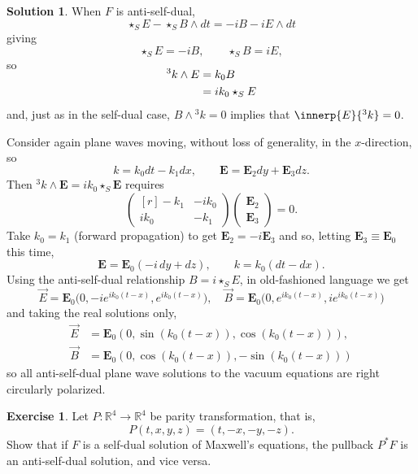 \documentclass[11pt, a4paper]{report}
\theoremstyle{definition}
\newtheorem{ex}{Exercise}[part]
\newtheorem{sol}{Solution}[part]
\begin{document}
\begin{sol}
When $F$ is anti-self-dual,
\[
    \star_S E - \star_S B \wedge dt = -iB - iE \wedge dt
\]
giving
\[
    \star_S E = -i B, \qquad
    \star_S B = iE,
\]
so
\begin{align*}
    \SwapAboveDisplaySkip
    ^3k \wedge E &= k_0 B \\
                 &= ik_0 \star_S E
\end{align*}
and, just as in the self-dual case, $B \wedge {}^3 k = 0$ implies that $\innerp{E}{^3k} = 0$.

Consider again plane waves moving, without loss of generality, in the $x$-direction, so
\[
    k = k_0 dt - k_1 dx, \qquad
    \mathbf{E} = \mathbf{E}_2 dy + \mathbf{E}_3 dz.
\]
Then $^3k \wedge \mathbf{E} = ik_0 \star_S \mathbf{E}$ requires
\[
    \begin{pmatrix*}[r]
        -k_1  & -ik_0 \\
        ik_0 & -k_1
    \end{pmatrix*}
    \begin{pmatrix}
        \mathbf{E}_2 \\ \mathbf{E}_3
    \end{pmatrix}
    = 0.
\]
Take $k_0 = k_1$ (forward propagation) to get $\mathbf{E}_2 = -i \mathbf{E}_3$ and so, letting $\mathbf{E}_3 \equiv \mathbf{E}_0$ this time,
\[
    \mathbf{E} = \mathbf{E}_0 (-i \, dy + dz), \qquad
    k = k_0 (dt - dx).
\]
Using the anti-self-dual relationship $B = i \star_S E$, in old-fashioned language we get
\[
    \vec{E} = \mathbf{E}_0 \bigl( 0, -ie^{ik_0 (t - x)}, e^{ik_0 (t - x)} \bigr), \quad
    \vec{B} = \mathbf{E}_0 \bigl( 0, e^{ik_0 (t - x)}, ie^{ik_0 (t - x)} \bigr)
\]
and taking the real solutions only,
\begin{align*}
    \vec{E} &= \mathbf{E}_0 (0, \sin(k_0 (t - x)), \cos(k_0 (t - x))), \\
    \vec{B} &= \mathbf{E}_0 (0, \cos(k_0 (t - x)), -\sin(k_0 (t - x)))
\end{align*}
so all anti-self-dual plane wave solutions to the vacuum equations are right circularly polarized.

\end{sol}

\begin{ex}

Let $P: \mathbb{R}^4 \to \mathbb{R}^4$ be parity transformation, that is,
\[
    P(t, x, y, z) = (t, -x, -y, -z).
\]
Show that if $F$ is a self-dual solution of Maxwell's equations, the pullback $P^* F$ is an anti-self-dual solution, and vice versa.

\end{ex}
\end{document}
